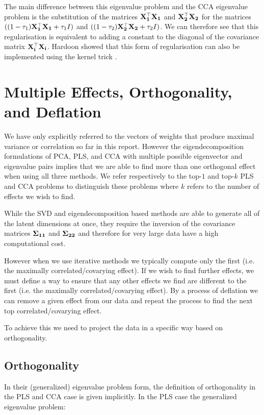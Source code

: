 The main difference between this eigenvalue problem and the CCA eigenvalue problem is the substitution of the matrices $\bold{X_1^{\top}X_1}$ and $\bold{X_2^{\top}X_2}$ for the matrices $((1-\tau_1)\bold{X_1^{\top}X_1}+\tau_1I)$ and $((1-\tau_2)\bold{X_2^{\top}X_2}+\tau_2I)$. We can therefore see that this regularisation is equivalent to adding a constant to the diagonal of the covariance matrix $\bold{X_i^{\top}X_i}$. Hardoon showed that this form of regularisation can also be implemented using the kernel trick \cite{hardoon2004canonical}.

\section{Multiple Effects, Orthogonality, and Deflation}\label{sec:orthogonality}

We have only explicitly referred to the vectors of weights that produce maximal variance or correlation so far in this report. However the eigendecomposition formulations of PCA, PLS, and CCA with multiple possible eigenvector and eigenvalue pairs implies that we are able to find more than one orthogonal effect when using all three methods. We refer respectively to the top-$1$ and top-$k$ PLS and CCA problems to distinguish these problems where $k$ refers to the number of effects we wish to find.

While the SVD and eigendecomposition based methods are able to generate all of the latent dimensions at once, they require the inversion of the covariance matrices $\bold{\Sigma_{11}}$ and $\bold{\Sigma_{22}}$ and therefore for very large data have a high computational cost.

However when we use iterative methods we typically compute only the first (i.e. the maximally correlated/covarying effect). If we wish to find further effects, we must define a way to ensure that any other effects we find are different to the first (i.e. the maximally correlated/covarying effect). By a process of deflation we can remove a given effect from our data and repeat the process to find the next top correlated/covarying effect.

To achieve this we need to project the data in a specific way based on orthogonality.

\subsection{Orthogonality}

In their (generalized) eigenvalue problem form, the definition of orthogonality in the PLS and CCA case is given implicitly. In the PLS case the generalized eigenvalue problem:

